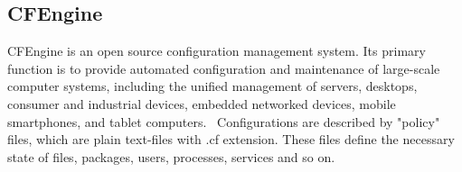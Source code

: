 \subsection*{CFEngine}
CFEngine is an open source configuration management system.
Its primary function is to provide automated configuration and maintenance of large-scale computer systems, including the unified management of servers, desktops, consumer and industrial devices, embedded networked devices, mobile smartphones, and tablet computers.~\cite{cfengine}
Configurations are described by "policy" files, which are plain text-files with .cf extension.
These files define the necessary state of files, packages, users, processes, services and so on.~\cite{cfengine2}
